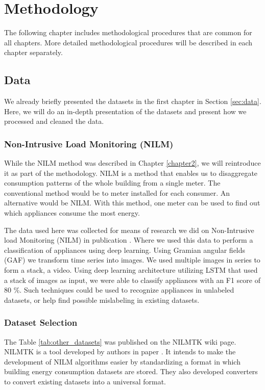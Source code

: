 
\chapter{Methodology} %
\label{chapter3} 

The following chapter includes methodological procedures that are common for all chapters.
More detailed methodological procedures will be described in each chapter separately. 

\section{Data}
\label{ssec:data}
We already briefly presented the datasets in the first chapter in Section \ref{sec:data}.
Here, we will do an in-depth presentation of the datasets and present how we processed and cleaned the data. 

\subsection{Non-Intrusive Load Monitoring (NILM)}

While the NILM method was described in Chapter \ref{chapter2}, we will reintroduce it as part of the methodology.
NILM is a method that enables us to disaggregate consumption patterns of the whole building from a single meter.
The conventional method would be to meter installed for each consumer.
An alternative would be NILM. With this method, one meter can be used to find out which appliances consume the most energy.

The data used here was collected for means of research we did on Non-Intrusive load Monitoring (NILM) in publication \cite{Blaz2022}.
Where we used this data to perform a classification of appliances using deep learning.
Using Gramian angular fields (GAF) we transform time series into images.
We used multiple images in series to form a stack, a video.
Using deep learning architecture utilizing LSTM that used a stack of images as input, we were able to classify appliances with an F1 score of 80 \%.
Such techniques could be used to recognize appliances in unlabeled datasets, or help find possible mislabeling in existing datasets.

\subsection{Dataset Selection}

The Table \ref{tab:other_datasets} was published on the NILMTK \cite{nilmtk} wiki page. 
NILMTK is a tool developed by authors in paper \cite{nilmtk}.
It intends to make the development of NILM algorithms easier by standardizing a format in which building energy consumption datasets are stored. 
They also developed converters to convert existing datasets into a universal format.

